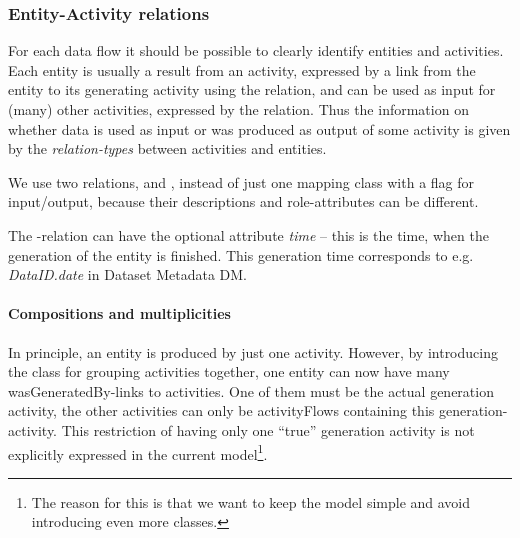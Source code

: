 \subsubsection{Entity-Activity relations}\label{sec:entity-activity-relations}

For each data flow it should be possible to clearly identify entities and 
activities. 
Each entity is usually a result from an activity, expressed by a link from 
the entity to its generating activity using the  relation,
and can be used as input for (many) other activities, expressed by the  relation.
Thus the information on whether data is used as input or was produced as output of 
some activity is given by the \emph{relation-types} between activities and entities.

We use two relations,  and , instead of just one
mapping class with a flag for input/output, because their descriptions and role-attributes
can be different. 

The -relation can have the optional attribute \emph{time} -- this is the time, when 
the generation of the entity is finished. This generation time corresponds to e.g. \emph{DataID.date} in 
Dataset Metadata DM.

\paragraph{Compositions and multiplicities}
In principle, an entity is produced by just one activity.
However, by introducing the  class for grouping activities together, 
one entity can now have many wasGeneratedBy-links to activities. One of them must 
be the actual generation activity, the other activities can only be activityFlows 
containing this generation-activity. This restriction of having only one ``true'' generation activity is not explicitly expressed in the current model\footnote{The reason for this is that we want to keep the model simple and avoid introducing even more classes.}.


